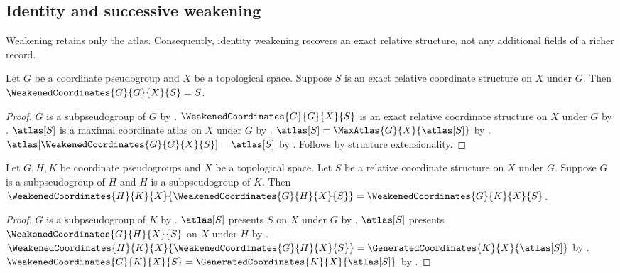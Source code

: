 \subsection{Identity and successive weakening}

Weakening retains only the atlas. Consequently, identity weakening recovers
an exact relative structure, not any additional fields of a richer record.

\begin{theorem}\label{weakened_coordinates_identity}
    Let $G$ be a coordinate pseudogroup and $X$ be a topological space.
    Suppose $S$ is an exact relative coordinate structure on $X$ under $G$.
    Then $\WeakenedCoordinates{G}{G}{X}{S}=S$.
\end{theorem}
\begin{proof}
    $G$ is a subpseudogroup of $G$ by .
    $\WeakenedCoordinates{G}{G}{X}{S}$ is an exact relative coordinate structure
        on $X$ under $G$ by .
    $\atlas[S]$ is a maximal coordinate atlas on $X$ under $G$ by .
    $\atlas[S]=\MaxAtlas{G}{X}{\atlas[S]}$ by
        .
    $\atlas[\WeakenedCoordinates{G}{G}{X}{S}]=\atlas[S]$ by
        .
    Follows by structure extensionality.
\end{proof}

\begin{theorem}\label{weakened_coordinates_transitive}
    Let $G,H,K$ be coordinate pseudogroups and $X$ be a topological space.
    Let $S$ be a relative coordinate structure on $X$ under $G$.
    Suppose $G$ is a subpseudogroup of $H$ and $H$ is a subpseudogroup of $K$.
    Then $\WeakenedCoordinates{H}{K}{X}{\WeakenedCoordinates{G}{H}{X}{S}}
        =\WeakenedCoordinates{G}{K}{X}{S}$.
\end{theorem}
\begin{proof}
    $G$ is a subpseudogroup of $K$ by .
    $\atlas[S]$ presents $S$ on $X$ under $G$ by .
    $\atlas[S]$ presents $\WeakenedCoordinates{G}{H}{X}{S}$ on $X$ under $H$ by
        .
    $\WeakenedCoordinates{H}{K}{X}{\WeakenedCoordinates{G}{H}{X}{S}}
        =\GeneratedCoordinates{K}{X}{\atlas[S]}$ by .
    $\WeakenedCoordinates{G}{K}{X}{S}=\GeneratedCoordinates{K}{X}{\atlas[S]}$ by
        .
\end{proof}


